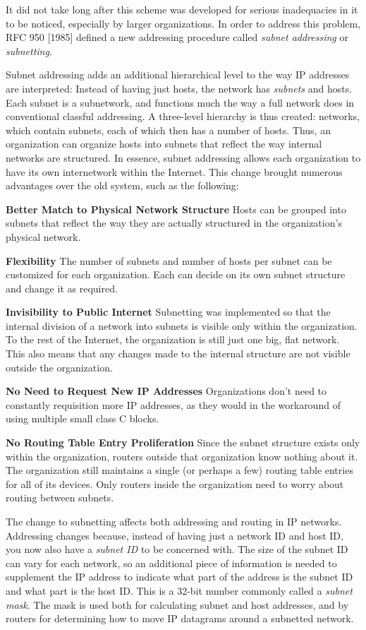 \documentclass[b5paper,11pt]{memoir}
\begin{document}
It did not take long after this scheme was developed for serious
inadequacies in it to be noticed, especially by larger organizations. In
order to address this problem, RFC 950 {[}1985{]} defined a new
addressing procedure called {\emph{subnet addressing}} or
{\emph{subnetting}}.

Subnet addressing adds an additional hierarchical level to the way IP
addresses are interpreted: Instead of having just hosts, the network has
{\emph{subnets}} and hosts. Each subnet is a subnetwork, and functions
much the way a full network does in conventional classful addressing. A
three-level hierarchy is thus created: networks, which contain subnets,
each of which then has a number of hosts. Thus, an organization can
organize hosts into subnets that reflect the way internal networks are
structured. In essence, subnet addressing allows each organization to
have its own internetwork within the Internet. This change brought
numerous advantages over the old system, such as the following:

{\textbf{Better Match to Physical Network Structure}} Hosts can be
grouped into subnets that reflect the way they are actually structured
in the organization's physical network.

{\textbf{Flexibility}} The number of subnets and number of hosts per
subnet can be customized for each organization. Each can decide on its
own subnet structure and change it as required.

{\textbf{Invisibility to Public Internet}} Subnetting was implemented so
that the internal division of a network into subnets is visible only
within the organization. To the rest of the Internet, the organization
is still just one big, flat network. This also means that any changes
made to the internal structure are not visible outside the organization.

{\textbf{No Need to Request New IP Addresses}} Organizations don't need
to constantly requisition more IP addresses, as they would in the
workaround of using multiple small class C blocks.

{\textbf{No Routing Table Entry Proliferation}} Since the subnet
structure exists only within the organization, routers outside that
organization know nothing about it. The organization still maintains a
single (or perhaps a few) routing table entries for all of its devices.
Only routers inside the organization need to worry about routing between
subnets.

The change to subnetting affects both addressing and routing in IP
networks. Addressing changes because, instead of having just a network
ID and host ID, you now also have a {\emph{subnet ID}} to be concerned
with. The size of the subnet ID can vary for each network, so an
additional piece of information is needed to supplement the IP address
to indicate what part of the address is the subnet ID and what part is
the host ID. This is a 32-bit number commonly called a {\emph{subnet
mask}}. The mask is used both for calculating subnet and host addresses,
and by routers for determining how to move IP datagrams around a
subnetted network.
\end{document}

